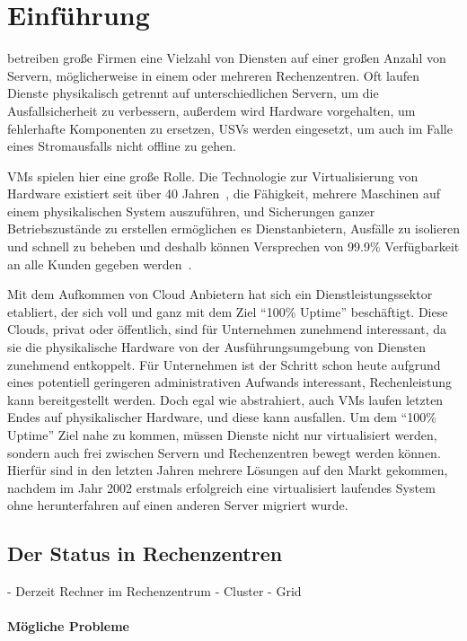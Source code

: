 \section{Einführung}
\label{sec:einfuehrung}
 betreiben große Firmen eine Vielzahl
von Diensten auf einer großen Anzahl von Servern, möglicherweise in
einem oder mehreren Rechenzentren. Oft laufen Dienste physikalisch
getrennt auf unterschiedlichen Servern, um die Ausfallsicherheit zu
verbessern, außerdem wird Hardware vorgehalten, um fehlerhafte
Komponenten zu ersetzen, \acp{USV} werden eingesetzt, um auch im Falle
eines Stromausfalls nicht offline zu gehen.

\acp{VM} spielen hier eine große Rolle. Die Technologie zur
Virtualisierung von Hardware existiert seit über 40
Jahren~\cite{tanenbaum1992modern}, die Fähigkeit, mehrere Maschinen
auf einem physikalischen System auszuführen, und Sicherungen ganzer
Betriebszustände zu erstellen ermöglichen es Dienstanbietern, Ausfälle
zu isolieren und schnell zu beheben und deshalb können Versprechen von
99.9\% Verfügbarkeit an alle Kunden gegeben
werden~\cite{google-app-sla}.

Mit dem Aufkommen von Cloud Anbietern hat sich ein
Dienstleistungssektor etabliert, der sich voll und ganz mit dem Ziel
"`100\% Uptime"' beschäftigt. Diese Clouds, privat oder öffentlich,
sind für Unternehmen zunehmend interessant, da sie die physikalische
Hardware von der Ausführungsumgebung von Diensten zunehmend
entkoppelt. Für Unternehmen ist der Schritt schon heute aufgrund eines
potentiell geringeren administrativen Aufwands interessant,
Rechenleistung kann bereitgestellt werden. Doch egal wie abstrahiert,
auch \acp{VM} laufen letzten Endes auf physikalischer Hardware, und
diese kann ausfallen. Um dem "`100\% Uptime"' Ziel nahe zu kommen,
müssen Dienste nicht nur virtualisiert werden, sondern auch frei
zwischen Servern und Rechenzentren bewegt werden können. Hierfür sind
in den letzten Jahren mehrere Lösungen auf den Markt gekommen, nachdem
im Jahr 2002 erstmals erfolgreich eine virtualisiert laufendes System
ohne herunterfahren auf einen anderen Server migriert wurde.

\subsection{Der Status in Rechenzentren}
- Derzeit Rechner im Rechenzentrum
- Cluster
- Grid

\paragraph*{Mögliche Probleme}
\label{sec:mogliche-probleme}

